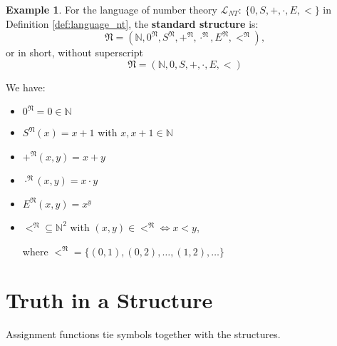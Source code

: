 \documentclass[11pt,letterpaper]{book}
\theoremstyle{definition}
\newtheorem{definition}{Definition}[section]
\newtheorem{example}{Example}[section]
\begin{document}
\begin{example}\label{example:standard_struc_NT}
For the language of number theory $\mathcal{L}_{NT}:\ \{ 0, S, +, \cdot,
E, <  \}$ in Definition \ref{def:language_nt}, the \textbf{standard
structure} is:
$$ \mathfrak{N} = ( \mathbb{N}, 0^{\mathfrak{N}}, S^{\mathfrak{N}},
+^{\mathfrak{N}}, \cdot ^{\mathfrak{N}}, E ^{\mathfrak{N}}, <
^{\mathfrak{N}} ),$$
or in short, without superscript
$$ \mathfrak{N} =(\mathbb{N}, 0, S, +, \cdot, E, <)$$

We have:
\begin{itemize}
\item{$0^{\mathfrak{N}} = 0 \in \mathbb{N}$}
\item{$S^{\mathfrak{N}} (x) = x+1$ with $x, x+1 \in \mathbb{N}$}
\item{$+^{\mathfrak{N}} (x,y) = x+y$}
\item{$\cdot ^{\mathfrak{N}} (x,y) =  x \cdot y$}
\item{$ E^{\mathfrak{N}} (x,y) = x^y $}
\item{$<^{\mathfrak{N}} \subseteq \mathbb{N}^2$ with $(x,y) \in
<^{\mathfrak{N}} \Leftrightarrow x < y$,

where $<^{\mathfrak{N}} = \{
(0,1), (0,2), \ldots, (1,2), \ldots \}$}
\end{itemize}

\end{example}

\section{Truth in a Structure}


Assignment functions tie symbols together with the structures.
%
%
%
%
\end{document}
